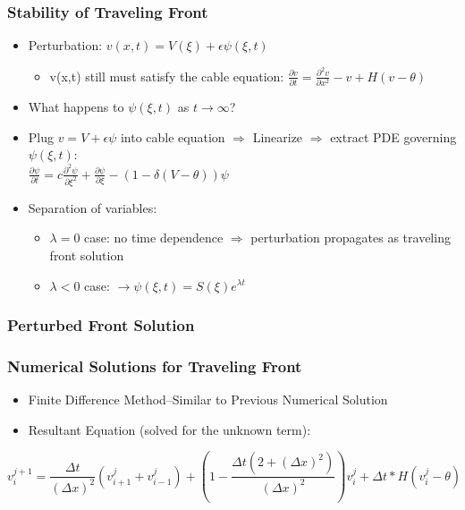 \documentclass{beamer}
\begin{document}
\begin{frame}
\frametitle{Stability of Traveling Front}
\begin{itemize}
	\item Perturbation: $v(x,t)=V(\xi)+\epsilon\psi(\xi,t)$
	\begin{itemize}
		\item v(x,t) still must satisfy the cable equation: $\frac{\partial v}{\partial t}=\frac{\partial ^2 v}{\partial x^2}-v+H(v-\theta)$
	\end{itemize}
	\item What happens to $\psi(\xi,t)$ as $t\rightarrow\infty$?
	\item Plug $v=V+\epsilon\psi$ into cable equation $\Rightarrow$ Linearize $\Rightarrow$ extract PDE governing $\psi(\xi,t)$: \\
	$\frac{\partial \psi}{\partial t} = c \frac{\partial^2\psi}{\partial\xi^2} + \frac{\partial\psi}{\partial\xi} - (1 - \delta(V-\theta))\psi$
	\item Separation of variables: 
		\begin{itemize}
		\item $\lambda=0$ case: no time dependence $\Rightarrow$ perturbation propagates as traveling front solution
		\item $\lambda<0$ case: $\rightarrow\psi(\xi,t)=S(\xi)e^{\lambda t}$
		\end{itemize}
\end{itemize}
\end{frame}

\begin{frame}
\frametitle{Perturbed Front Solution}
\end{frame}

\begin{frame}
\frametitle{Numerical Solutions for Traveling Front}
\begin{itemize}
	\item{Finite Difference Method--Similar to Previous Numerical Solution}
	\item{Resultant Equation (solved for the unknown term):}
\end{itemize}
\[v^{j+1}_i=\frac{\Delta{t}}{(\Delta{x})^2}(v^{j}_{i+1}+v^{j}_{i-1})+(1-\frac{\Delta{t}(2+(\Delta{x})^2)}{(\Delta{x})^2})v^{j}_{i}+\Delta{t}*H(v^j_i-\theta)\]


\end{frame}
\end{document}
